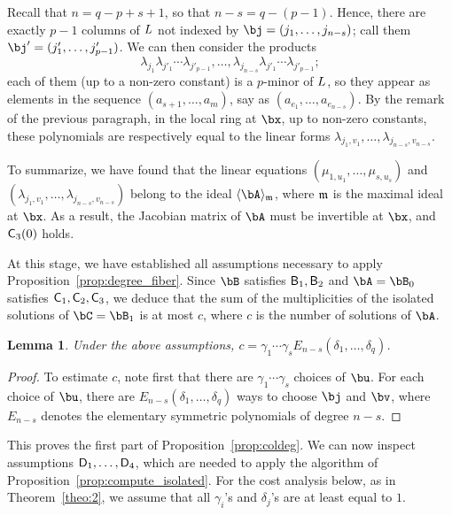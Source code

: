 \documentclass[12pt]{article}
\newtheorem{lemma}[definition]{Lemma}
\begin{document}
Recall that $n=q-p+s+1$, so that $n-s = q-(p-1)$. Hence, there are
exactly $p-1$ columns of ${L}$ not indexed by $\bj=(j_1,\dots,j_{n-s})$; call
them $\bj'=(j'_1,\dots,j'_{p-1})$. We can then consider the 
products
$$ \lambda_{j_1} \lambda_{j'_1} \cdots \lambda_{j'_{p-1}},\dots, \lambda_{j_{n-s}}
\lambda_{j'_1} \cdots \lambda_{j'_{p-1}};$$ each of them (up to a non-zero
constant) is a $p$-minor of ${L}$, so they appear as elements in the
sequence $(a_{s+1},\dots,a_m)$, say as
$(a_{e_1},\dots,a_{e_{n-s}})$. By the remark of the previous
paragraph, in the local ring at $\bx$, up to non-zero constants, these
polynomials are respectively equal to the linear forms
$\lambda_{j_1,v_1},\dots,\lambda_{j_{n-s},v_{n-s}}$.  

To summarize, we have found that the linear equations
$(\mu_{1,u_1},\dots,\mu_{s,u_s})$ and
$(\lambda_{j_1,v_1},\dots,\lambda_{j_{n-s},v_{n-s}})$ belong to the
ideal $\langle \bA \rangle_\m$, where $\mathfrak{m}$ is the maximal ideal at
$\bx$. As a result, the Jacobian matrix of $\bA$ must be invertible
at $\bx$, and $\mathsf{C}_3(0)$ holds.


\medskip

At this stage, we have established all assumptions necessary to apply
Proposition~\ref{prop:degree_fiber}. Since $\bB$ satisfies
$\mathsf{B}_1,\mathsf{B}_2$ and $\bA=\bB_0$ satisfies $\mathsf{C}_1,\mathsf{C}_2,\mathsf{C}_3$,
we deduce that the sum of the multiplicities of the isolated solutions
of $\bC=\bB_1$ is at most $c$, where $c$ is the number of solutions of
$\bA$. 

\begin{lemma}\label{lemma:column:c_estimate}
  Under the above assumptions, $c=\gamma_1\cdots \gamma_s
  E_{n-s}(\delta_1, \ldots, \delta_q)$.
\end{lemma}
\begin{proof}
  To estimate $c$, note first that there are $\gamma_1\cdots
  \gamma_s$ choices of $\bu$. For each choice of $\bu$, there are
  $E_{n-s}(\delta_1, \ldots, \delta_q)$ ways to
  choose $\bj$ and $\bv$, where $E_{n-s}$ denotes the elementary
  symmetric polynomials of degree $n-s$.   
\end{proof}
This proves the first part of Proposition~\ref{prop:coldeg}.
We can now inspect assumptions $\mathsf{D}_1,\dots,\mathsf{D}_4$, which are
needed to apply the algorithm of
Proposition~\ref{prop:compute_isolated}. For the cost analysis 
below, as in Theorem~\ref{theo:2}, we assume that 
all $\gamma_i$'s and $\delta_j$'s are at least equal to $1$.
\end{document}
